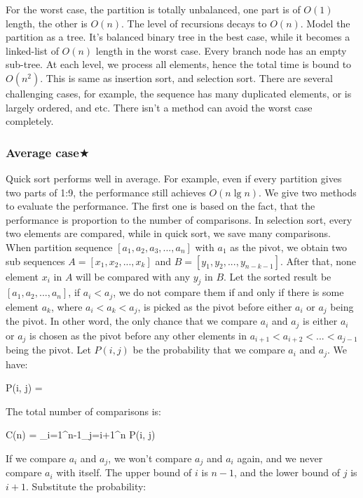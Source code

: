 \documentclass[b5paper]{article}
\begin{document}
For the worst case, the partition is totally unbalanced, one part is of $O(1)$ length, the other is $O(n)$. The level of recursions decays to $O(n)$. Model the partition as a tree. It's balanced binary tree in the best case, while it becomes a linked-list of $O(n)$ length in the worst case. Every branch node has an empty sub-tree. At each level, we process all elements, hence the total time is bound to $O(n^2)$. This is same as insertion sort, and selection sort. There are several challenging cases, for example, the sequence has many duplicated elements, or is largely ordered, and etc. There isn't a method can avoid the worst case completely.

\subsubsection{Average case\texorpdfstring{$\bigstar$}{★}}

Quick sort performs well in average. For example, even if every partition gives two parts of 1:9, the performance still achieves $O(n \lg n)$\cite{CLRS}. We give two methods to evaluate the performance. The first one is based on the fact, that the performance is proportion to the number of comparisons. In selection sort, every two elements are compared, while in quick sort, we save many comparisons. When partition sequence $[a_1, a_2, a_3, ..., a_n]$ with $a_1$ as the pivot, we obtain two sub sequences $A = [x_1, x_2, ..., x_k]$ and $B = [y_1, y_2, ..., y_{n-k-1}]$. After that, none element $x_i$ in $A$ will be compared with any $y_j$ in $B$. Let the sorted result be $[a_1, a_2, ..., a_n]$, if $a_i < a_j$, we do not compare them if and only if there is some element $a_k$, where $a_i < a_k < a_j$, is picked as the pivot before either $a_i$ or $a_j$ being the pivot. In other word, the only chance that we compare $a_i$ and $a_j$ is either $a_i$ or $a_j$ is chosen as the pivot before any other elements in $a_{i+1} < a_{i+2} < ... < a_{j-1}$ being the pivot. Let $P(i, j)$ be the probability that we compare $a_i$ and $a_j$. We have:

\be
P(i, j) = 
\ee

The total number of comparisons is:

\be
C(n) = \sum_{i=1}^{n-1}\sum_{j=i+1}^{n} P(i, j)
\ee

If we compare $a_i$ and $a_j$, we won't compare $a_j$ and $a_i$ again, and we never compare $a_i$ with itself. The upper bound of $i$ is $n-1$, and the lower bound of $j$ is $i+1$. Substitute the probability:
\end{document}
